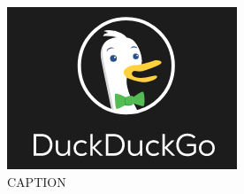 \documentclass{article}
\begin{document}
\begin{figure}[ht]
  \centering
  \includegraphics[scale=0.8\linewidth]{.ghost/TEST}
  \caption{CAPTION}
  \label{fig:type}
\end{figure}
\end{document}
